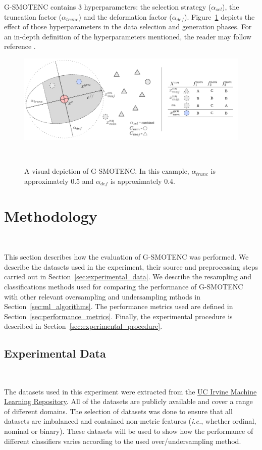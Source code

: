 \documentclass[parskip=full]{scrartcl}
\begin{document}
G-SMOTENC contains 3 hyperparameters: the selection strategy ($\alpha_{sel}$),
the truncation factor ($\alpha_{trunc}$) and the deformation factor
($\alpha_{def}$). Figure~\ref{fig:gsmote} depicts the effect of those
hyperparameters in the data selection and generation phases. For an in-depth
definition of the hyperparameters mentioned, the reader may follow reference
\cite{douzas2019geometric}.

\begin{figure}[H]
	\centering
	\includegraphics[width=\linewidth]{../analysis/g-smote}
    \caption{A visual depiction of G-SMOTENC. In this example,
        $\alpha_{trunc}$ is approximately 0.5 and $\alpha_{def}$ is
        approximately 0.4.
    }~\label{fig:gsmote}
\end{figure}

\section{Methodology}~\label{sec:methodology}

This section describes how the evaluation of G-SMOTENC was performed. We
describe the datasets used in the experiment, their source and preprocessing
steps carried out in Section~\ref{sec:experimental_data}. We describe the
resampling and classifications methods used for comparing the performance of
G-SMOTENC with other relevant oversampling and undersampling mthods in
Section~\ref{sec:ml_algorithms}. The performance metrics used are defined in
Section~\ref{sec:performance_metrics}. Finally, the experimental procedure is
described in Section~\ref{sec:experimental_procedure}.

\subsection{Experimental Data}~\label{sec:experimental_data}

The datasets used in this experiment were extracted from the
\href{https://archive.ics.uci.edu}{UC Irvine Machine Learning Repository}. All
of the datasets are publicly available and cover a range of different domains.
The selection of datasets was done to ensure that all datasets are imbalanced
and contained non-metric features (\textit{i.e.}, whether ordinal, nominal or
binary). These datasets will be used to show how the performance of different
classifiers varies according to the used over/undersampling method.
\end{document}
